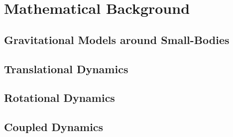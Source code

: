 
\chapter{Mathematical Background}

\section{Gravitational Models around Small-Bodies}

\section{Translational Dynamics}

\section{Rotational Dynamics}

\section{Coupled Dynamics}
